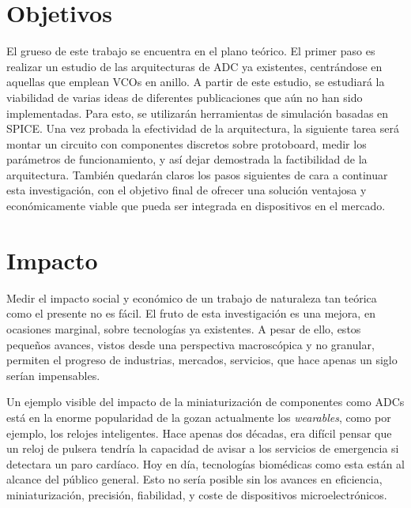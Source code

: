 \documentclass[12pt]{report} %
\begin{document}
	\section{Objetivos}
	
	El grueso de este trabajo se encuentra en el plano teórico. El primer paso es realizar un estudio de las arquitecturas de ADC ya existentes, centrándose en aquellas que emplean VCOs en anillo. A partir de este estudio, se estudiará la viabilidad de varias ideas de diferentes publicaciones que aún no han sido implementadas. Para esto, se utilizarán herramientas de simulación basadas en SPICE. Una vez probada la efectividad de la arquitectura, la siguiente tarea será montar un circuito con componentes discretos sobre protoboard, medir los parámetros de funcionamiento, y así dejar demostrada la factibilidad de la arquitectura. También quedarán claros los pasos siguientes de cara a continuar esta investigación, con el objetivo final de ofrecer una solución ventajosa y económicamente viable que pueda ser integrada en dispositivos en el mercado.
	
	\section{Impacto}\label{st:impact}
	
	
	Medir el impacto social y económico de un trabajo de naturaleza tan teórica como el presente no es fácil. El fruto de esta investigación es una mejora, en ocasiones marginal, sobre tecnologías ya existentes. A pesar de ello, estos pequeños avances, vistos desde una perspectiva macroscópica y no granular, permiten el progreso de industrias, mercados, servicios, que hace apenas un siglo serían impensables.
	
	Un ejemplo visible del impacto de la miniaturización de componentes como ADCs está en la enorme popularidad de la gozan actualmente los \textit{wearables}, como por ejemplo, los relojes inteligentes. Hace apenas dos décadas, era difícil pensar que un reloj de pulsera tendría la capacidad de avisar a los servicios de emergencia si detectara un paro cardíaco. Hoy en día, tecnologías biomédicas como esta están al alcance del público general. Esto no sería posible sin los avances en eficiencia, miniaturización, precisión, fiabilidad, y coste de dispositivos microelectrónicos. 
	
\end{document}
